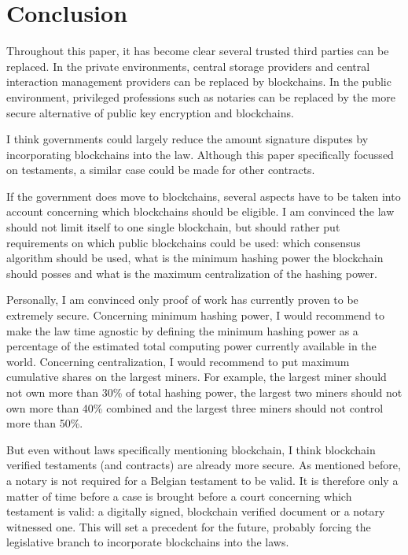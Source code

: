 \chapter{Conclusion}

Throughout this paper, it has become clear several trusted third parties can be replaced. In the private environments, central storage providers and central interaction management providers can be replaced by blockchains. In the public environment, privileged professions such as notaries can be replaced by the more secure alternative of public key encryption and blockchains.

I think governments could largely reduce the amount signature disputes by incorporating blockchains into the law. Although this paper specifically focussed on testaments, a similar case could be made for other contracts. 

If the government does move to blockchains, several aspects have to be taken into account concerning which blockchains should be eligible. I am convinced the law should not limit itself to one single blockchain, but should rather put requirements on which public blockchains could be used: which consensus algorithm should be used, what is the minimum hashing power the blockchain should posses and what is the maximum centralization of the hashing power. 

Personally, I am convinced only proof of work has currently proven to be extremely secure. Concerning minimum hashing power, I would recommend to make the law time agnostic by defining the minimum hashing power as a percentage of the estimated total computing power currently available in the world. Concerning centralization, I would recommend to put maximum cumulative shares on the largest miners. For example, the largest miner should not own more than 30\% of total hashing power, the largest two miners should not own more than 40\% combined and the largest three miners should not control more than 50\%. 

But even without laws specifically mentioning blockchain, I think blockchain verified testaments (and contracts) are already more secure. As mentioned before, a notary is not required for a Belgian testament to be valid. It is therefore only a matter of time before a case is brought before a court concerning which testament is valid: a digitally signed, blockchain verified document or a notary witnessed one. This will set a precedent for the future, probably forcing the legislative branch to incorporate blockchains into the laws.

